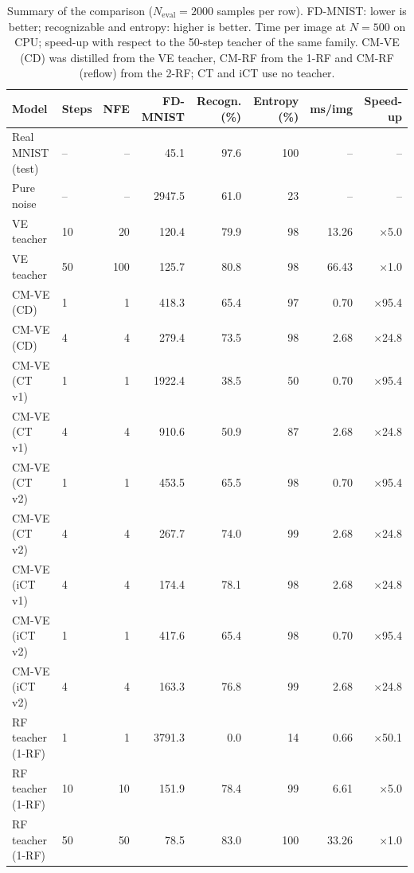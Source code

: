 \documentclass{article}
\begin{document}
\begin{table}[!htbp]
  \caption{Summary of the comparison ($N_\text{eval} = 2000$ samples per row).
  FD-MNIST: lower is better; recognizable and entropy: higher is better.
  Time per image at $N = 500$ on CPU; speed-up with respect to the 50-step
  teacher of the same family. CM-VE (CD) was distilled from the VE teacher,
  CM-RF from the 1-RF and CM-RF (reflow) from the 2-RF; CT and iCT use no
  teacher.}
  \label{tab:summary}
  \centering
  \footnotesize
  \begin{tabular}{llrrrrrr}
    \toprule
    Model & Steps & NFE & FD-MNIST & Recogn. (\%) & Entropy (\%) & ms/img & Speed-up \\
    \midrule
    Real MNIST (test) & -- & -- & 45.1 & 97.6 & 100 & -- & -- \\
    Pure noise & -- & -- & 2947.5 & 61.0 & 23 & -- & -- \\
    \midrule
    VE teacher & 10 & 20 & 120.4 & 79.9 & 98 & 13.26 & $\times$5.0 \\
    VE teacher & 50 & 100 & 125.7 & 80.8 & 98 & 66.43 & $\times$1.0 \\
    \midrule
    CM-VE (CD) & 1 & 1 & 418.3 & 65.4 & 97 & 0.70 & $\times$95.4 \\
    CM-VE (CD) & 4 & 4 & 279.4 & 73.5 & 98 & 2.68 & $\times$24.8 \\
    \midrule
    CM-VE (CT v1) & 1 & 1 & 1922.4 & 38.5 & 50 & 0.70 & $\times$95.4 \\
    CM-VE (CT v1) & 4 & 4 & 910.6 & 50.9 & 87 & 2.68 & $\times$24.8 \\
    CM-VE (CT v2) & 1 & 1 & 453.5 & 65.5 & 98 & 0.70 & $\times$95.4 \\
    CM-VE (CT v2) & 4 & 4 & 267.7 & 74.0 & 99 & 2.68 & $\times$24.8 \\
    CM-VE (iCT v1) & 4 & 4 & 174.4 & 78.1 & 98 & 2.68 & $\times$24.8 \\
    CM-VE (iCT v2) & 1 & 1 & 417.6 & 65.4 & 98 & 0.70 & $\times$95.4 \\
    CM-VE (iCT v2) & 4 & 4 & 163.3 & 76.8 & 99 & 2.68 & $\times$24.8 \\
    \midrule
    RF teacher (1-RF) & 1 & 1 & 3791.3 & 0.0 & 14 & 0.66 & $\times$50.1 \\
    RF teacher (1-RF) & 10 & 10 & 151.9 & 78.4 & 99 & 6.61 & $\times$5.0 \\
    RF teacher (1-RF) & 50 & 50 & 78.5 & 83.0 & 100 & 33.26 & $\times$1.0 \\

\end{tabular}
\end{table}
\end{document}
